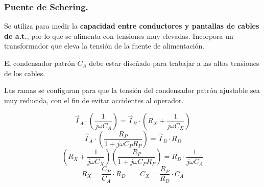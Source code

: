 		\newpage
		\subsubsection{Puente de Schering.}
			Se utiliza para medir la \textbf{capacidad entre conductores y pantallas de cables de a.t.}, por lo que se alimenta con tensiones muy elevadas. Incorpora un transformador que eleva la tensión de la fuente de alimentación.
			
			
			El condensador patrón $C_A$ debe estar diseñado para trabajar a las altas tensiones de los cables.
			
			
			Las ramas se configuran para que la tensión del condensador patrón ajustable sea muy reducida, con el fin de evitar accidentes al operador.
			
			\[\vec I_A\cdot \left(\dfrac{1}{j\omega C_A}\right) = \vec I_B\cdot \left(R_X + \dfrac{1}{j\omega C_X}\right)\]
			\[\vec I_A\cdot \left(\dfrac{R_P}{1+j\omega C_PR_P}\right) = \vec I_B\cdot R_D\]
			\[\left(R_X + \dfrac{1}{j\omega C_X}\right)\left(\dfrac{R_P}{1+j\omega C_PR_P}\right) = R_D\cdot \dfrac{1}{j\omega C_A}\]
			\[R_X = \dfrac{C_P}{C_A}\cdot R_D \qquad C_X = \dfrac{R_P}{R_D}\cdot C_A\]
			
